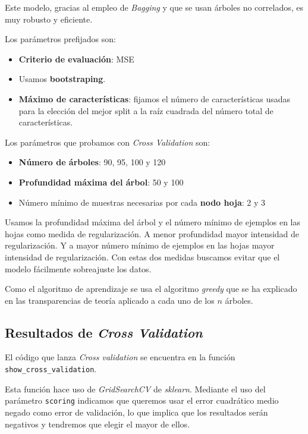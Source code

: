 \documentclass[11pt]{article}
\begin{document}
Este modelo, gracias al empleo de \emph{Bagging} y que se usan árboles no correlados, es muy robusto y eficiente.

Los parámetros prefijados son:

\begin{itemize}
  \item \textbf{Criterio de evaluación}: MSE
  \item Usamos \textbf{bootstraping}.
  \item \textbf{Máximo de características}: fijamos el número de características usadas para la elección del mejor split a la raíz cuadrada del número total de características.
\end{itemize}

Los parámetros que probamos con \emph{Cross Validation} son:

\begin{itemize}
  \item \textbf{Número de árboles}: 90, 95, 100 y 120
  \item \textbf{Profundidad máxima del árbol}: 50 y 100
  \item Número mínimo de muestras necesarias por cada \textbf{nodo hoja}: 2 y 3
\end{itemize}

Usamos la profundidad máxima del árbol y el número mínimo de ejemplos en las hojas como medida de regularización. A menor profundidad mayor intensidad de regularización. Y a mayor número mínimo de ejemplos en las hojas mayor intensidad de regularización. Con estas dos medidas buscamos evitar que el modelo fácilmente sobreajuste los datos.

Como el algoritmo de aprendizaje se usa el algoritmo \emph{greedy} que se ha explicado en las transparencias de teoría aplicado a cada uno de los $n$ árboles.

\subsection{Resultados de \emph{Cross Validation}} \label{cross_validation}

El código que lanza \emph{Cross validation} se encuentra en la función \lstinline{show_cross_validation}.

Esta función hace uso de \emph{GridSearchCV} de \emph{sklearn}. Mediante el uso del parámetro \lstinline{scoring} indicamos que queremos usar el error cuadrático medio negado como error de validación, lo que implica que los resultados serán negativos y tendremos que elegir el mayor de ellos.
\end{document}
